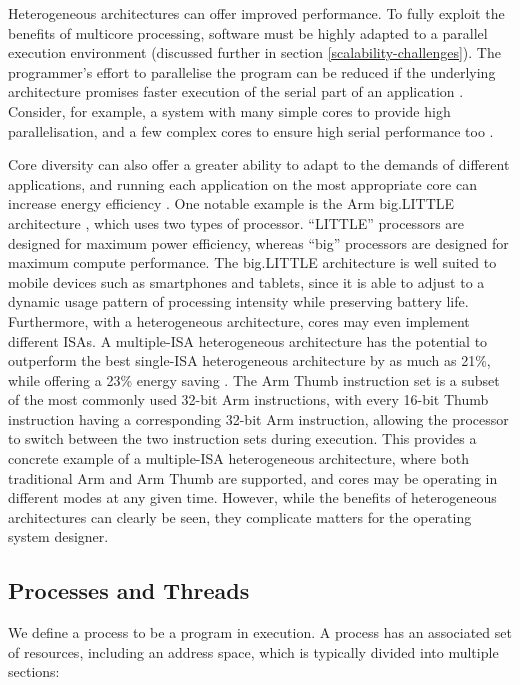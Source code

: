\documentclass[bsc,frontabs,singlespacing,parskip,deptreport]{infthesis}
\begin{document}
Heterogeneous architectures can offer improved performance. To fully exploit the benefits of multicore processing, software must be highly adapted to a parallel execution environment (discussed further in section \ref{scalability-challenges}). The programmer's effort to parallelise the program can be reduced if the underlying architecture promises faster execution of the serial part of an application \cite{suleman_2007}. Consider, for example, a system with many simple cores to provide high parallelisation, and a few complex cores to ensure high serial performance too \cite{balakrishnan_2005}. 

Core diversity can also offer a greater ability to adapt to the demands of different applications, and running each application on the most appropriate core can increase energy efficiency \cite{kumar_2003}. One notable example is the Arm big.LITTLE architecture \cite{big.little}, which uses two types of processor. “LITTLE” processors are designed for maximum power efficiency, whereas “big” processors are designed for maximum compute performance. The big.LITTLE architecture is well suited to mobile devices such as smartphones and tablets, since it is able to adjust to a dynamic usage pattern of processing intensity while preserving battery life. Furthermore, with a heterogeneous architecture, cores may even implement different ISAs. A multiple-ISA heterogeneous architecture has the potential to outperform the best single-ISA heterogeneous architecture by as much as 21\%, while offering a 23\% energy saving \cite{venkat_2014}. The Arm Thumb instruction set is a subset of the most commonly used 32-bit Arm instructions, with every 16-bit Thumb instruction having a corresponding 32-bit Arm instruction, allowing the processor to switch between the two instruction sets during execution. This provides a concrete example of a multiple-ISA heterogeneous architecture, where both traditional Arm and Arm Thumb are supported, and cores may be operating in different modes at any given time. However, while the benefits of heterogeneous architectures can clearly be seen, they complicate matters for the operating system designer.

\subsection{Processes and Threads} 
\label{processes-threads}
We define a process to be a program in execution. A process has an associated set of resources, including an address space, which is typically divided into multiple sections:
\end{document}
